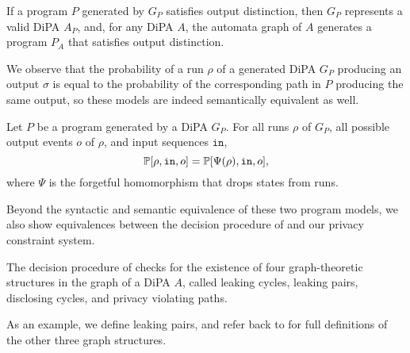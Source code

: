 \begin{prop}
    If a program $P$ generated by $G_P$ satisfies output distinction, then $G_P$ represents a valid DiPA $A_P$, and, for any DiPA $A$, the automata graph of $A$ generates a program $P_A$ that satisfies output distinction. 
\end{prop}

We observe that the probability of a run $\rho$ of a generated DiPA $G_P$ producing an output $\sigma$ is equal to the probability of the corresponding path in $P$ producing the same output, so these models are indeed semantically equivalent as well.

\begin{prop}
    Let $P$ be a program generated by a DiPA $G_P$. For all runs $\rho$ of $G_P$, all possible output events $o$ of $\rho$, and input sequences $\texttt{in}$, \[
        \mathbb{P}[\rho, \texttt{in}, o]=\mathbb{P}[\Psi(\rho), \texttt{in}, o],
    \]
    where $\Psi$ is the forgetful homomorphism that drops states from runs. 
\end{prop}

Beyond the syntactic and semantic equivalence of these two program models, we also show equivalences between the decision procedure of \cite{chadhaLinearTimeDecidability2021} and our privacy constraint system. 

The decision procedure of \cite{chadhaLinearTimeDecidability2021} checks for the existence of four graph-theoretic structures in the graph of a DiPA $A$, called leaking cycles, leaking pairs, disclosing cycles, and privacy violating paths. 

As an example, we define leaking pairs, and refer back to \cite{chadhaLinearTimeDecidability2021} for full definitions of the other three graph structures.

